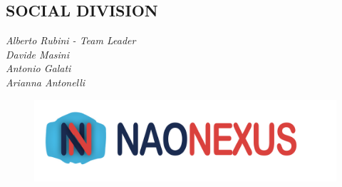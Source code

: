\documentclass{optica-article}
\begin{document}
\bigskip

\subsection{SOCIAL DIVISION}

\noindent\emph{Alberto Rubini - Team Leader}\\
\emph{Davide Masini}\\
\emph{Antonio Galati}\\
\emph{Arianna Antonelli}\\


\begin{figure}[b]
    \centering
    \includegraphics[scale=0.04]{figures/logo.png}
    \label{fig:logo_con_scritta1}
\end{figure}


\end{document}
